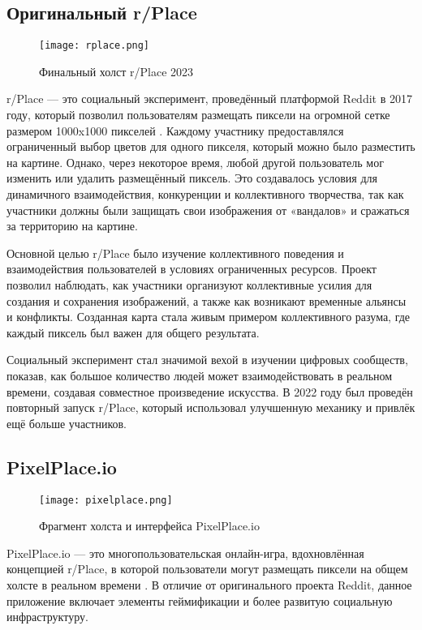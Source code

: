 \newpage


\subsection{Оригинальный r/Place}

\begin{figure}[H]
    \texttt{[image: rplace.png]}
    \caption{Финальный холст r/Place 2023}
\end{figure}

r/Place --- это социальный эксперимент, проведённый платформой Reddit в 2017 году, который позволил пользователям размещать пиксели на огромной сетке размером 1000x1000 пикселей \cite{rplace}. Каждому участнику предоставлялся ограниченный выбор цветов для одного пикселя, который можно было разместить на картине. Однако, через некоторое время, любой другой пользователь мог изменить или удалить размещённый пиксель. Это создавалось условия для динамичного взаимодействия, конкуренции и коллективного творчества, так как участники должны были защищать свои изображения от «вандалов» и сражаться за территорию на картине.

Основной целью r/Place было изучение коллективного поведения и взаимодействия пользователей в условиях ограниченных ресурсов. Проект позволил наблюдать, как участники организуют коллективные усилия для создания и сохранения изображений, а также как возникают временные альянсы и конфликты. Созданная карта стала живым примером коллективного разума, где каждый пиксель был важен для общего результата.

Социальный эксперимент стал значимой вехой в изучении цифровых сообществ, показав, как большое количество людей может взаимодействовать в реальном времени, создавая совместное произведение искусства. В 2022 году был проведён повторный запуск r/Place, который использовал улучшенную механику и привлёк ещё больше участников.

\subsection{PixelPlace.io}

\begin{figure}[H]
    \texttt{[image: pixelplace.png]}
    \caption{Фрагмент холста и интерфейса PixelPlace.io}
\end{figure}

PixelPlace.io --- это многопользовательская онлайн-игра, вдохновлённая концепцией r/Place, в которой пользователи могут размещать пиксели на общем холсте в реальном времени \cite{pixelplace}. В отличие от оригинального проекта Reddit, данное приложение включает элементы геймификации и более развитую социальную инфраструктуру.

